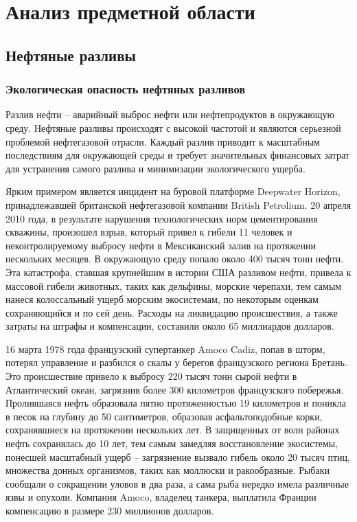 \section{Анализ предметной области}

\subsection{Нефтяные разливы}

\subsubsection{Экологическая опасность нефтяных разливов}
Разлив нефти -- аварийный выброс нефти или нефтепродуктов в окружающую среду. Нефтяные разливы происходят с высокой частотой и являются серьезной проблемой нефтегазовой отрасли. Каждый разлив приводит к масштабным последствиям для окружающей среды и требует значительных финансовых затрат для устранения самого разлива и минимизации экологического ущерба. 

Ярким примером является инцидент на буровой платформе Deepwater Horizon, принадлежавшей британской нефтегазовой компании British Petrolium. 20 апреля 2010 года, в результате нарушения технологических норм цементирования скважины, произошел взрыв, который привел к гибели 11 человек и неконтролируемому выбросу нефти в Мексиканский залив на протяжении нескольких месяцев. В окружающую среду попало около 400 тысяч тонн нефти. Эта катастрофа, ставшая крупнейшим в истории США разливом нефти, привела к массовой гибели животных, таких как дельфины, морские черепахи, тем самым нанеся колоссальный ущерб морским экосистемам, по некоторым оценкам сохраняющийся и по сей день. Расходы на ликвидацию происшествия, а также затраты на штрафы и компенсации, составили около 65 миллиардов долларов.

16 марта 1978 года французский супертанкер Amoco Cadiz, попав в шторм, потерял управление и разбился о скалы у берегов французского региона Бретань. Это происшествие привело к выбросу 220 тысяч тонн сырой нефти в Атлантический океан, загрязнив более 300 километров французского побережья. Пролившаяся нефть образовала пятно протяженностью 19 километров и поникла в песок на глубину до 50 сантиметров, образовав асфальтоподобные корки, сохранявшиеся на протяжении нескольких лет. В защищенных от волн районах нефть сохранялась до 10 лет, тем самым замедляя восстановление экосистемы, понесшей масштабный ущерб -- загрязнение вызвало гибель около 20 тысяч птиц, множества донных организмов, таких как моллюски и ракообразные. Рыбаки сообщали о сокращении уловов в два раза, а сама рыба нередко имела различные язвы и опухоли. Компания Amoco, владелец танкера, выплатила Франции компенсацию в размере 230 миллионов долларов.

